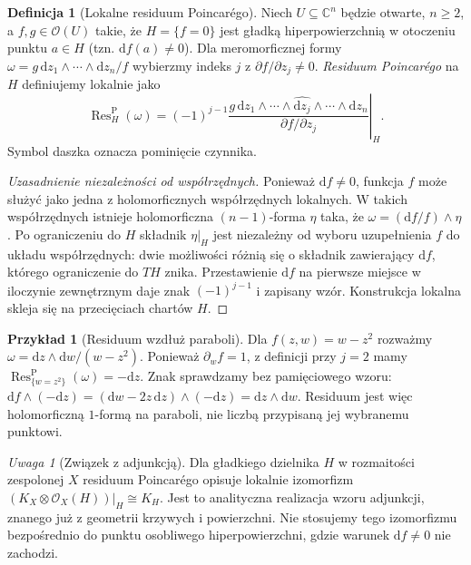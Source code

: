\documentclass[11pt,a4paper,openany]{report}
\numberwithin{equation}{section}
\theoremstyle{plain}
\theoremstyle{definition}
\newtheorem{definicja}[twierdzenie]{Definicja}
\newtheorem{przyklad}[twierdzenie]{Przykład}
\theoremstyle{remark}
\newtheorem{uwaga}[twierdzenie]{Uwaga}
\newcommand{\C}{\mathbb C}
\begin{document}
\begin{definicja}[Lokalne residuum Poincarégo]
\label{def:ga4-poincare-res}
Niech $U\subseteq\C^n$ będzie otwarte, $n\ge2$, a
$f,g\in\mathcal O(U)$ takie, że $H=\{f=0\}$ jest
gładką hiperpowierzchnią w otoczeniu punktu $a\in H$
(tzn. $\mathrm df(a)\ne0$). Dla meromorficznej formy
$\omega=g\,\mathrm dz_1\wedge\cdots\wedge\mathrm dz_n/f$
wybierzmy indeks $j$ z $\partial f/\partial z_j\ne0$.
\emph{Residuum Poincarégo} na $H$ definiujemy lokalnie jako
\[
\operatorname{Res}_H^{\mathrm P}(\omega)
=\left.(-1)^{j-1}\frac{g\,\mathrm dz_1\wedge\cdots
\wedge\widehat{\mathrm dz_j}\wedge\cdots\wedge\mathrm dz_n}
{\partial f/\partial z_j}\right|_H.
\]
Symbol daszka oznacza pominięcie czynnika.
\end{definicja}
\begin{proof}[Uzasadnienie niezależności od współrzędnych]
Ponieważ $\mathrm df\ne0$, funkcja $f$ może służyć
jako jedna z holomorficznych współrzędnych lokalnych.
W takich współrzędnych istnieje holomorficzna $(n-1)$-forma
$\eta$ taka, że $\omega=(\mathrm df/f)\wedge\eta$.
Po ograniczeniu do $H$ składnik $\eta|_H$ jest
niezależny od wyboru uzupełnienia $f$ do układu
współrzędnych: dwie możliwości różnią się o składnik
zawierający $\mathrm df$, którego ograniczenie do $TH$
znika. Przestawienie $\mathrm df$ na pierwsze miejsce
w iloczynie zewnętrznym daje znak $(-1)^{j-1}$
i zapisany wzór. Konstrukcja lokalna skleja się na
przecięciach chartów $H$.
\end{proof}

\begin{przyklad}[Residuum wzdłuż paraboli]
Dla $f(z,w)=w-z^2$ rozważmy
$\omega=\mathrm dz\wedge\mathrm dw/(w-z^2)$.
Ponieważ $\partial_w f=1$, z definicji przy $j=2$ mamy
$\operatorname{Res}^{\mathrm P}_{\{w=z^2\}}(\omega)=-\mathrm dz$.
Znak sprawdzamy bez pamięciowego wzoru:
$\mathrm df\wedge(-\mathrm dz)
=(\mathrm dw-2z\,\mathrm dz)\wedge(-\mathrm dz)
=\mathrm dz\wedge\mathrm dw$.
Residuum jest więc holomorficzną $1$-formą na paraboli,
nie liczbą przypisaną jej wybranemu punktowi.
\end{przyklad}

\begin{uwaga}[Związek z adjunkcją]
Dla gładkiego dzielnika $H$ w rozmaitości zespolonej $X$
residuum Poincarégo opisuje lokalnie izomorfizm
$(K_X\otimes\mathcal O_X(H))|_H\cong K_H$.
Jest to analityczna realizacja wzoru adjunkcji,
znanego już z geometrii krzywych i powierzchni.
Nie stosujemy tego izomorfizmu bezpośrednio do punktu
osobliwego hiperpowierzchni, gdzie warunek $\mathrm df\ne0$
nie zachodzi.
\end{uwaga}
\end{document}
